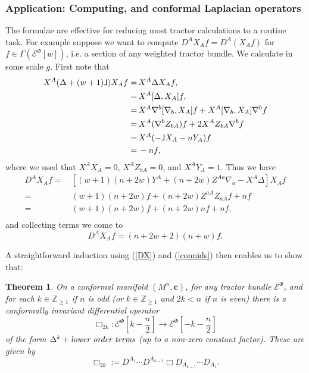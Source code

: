 \documentclass[a4paper,12pt]{amsart}
\def\Cal{\mathcal}
\newcommand{\J}{\mbox{\sf J}}
\newcommand{\cc}{\boldsymbol{c}}
\newcommand{\ce}{{\Cal E}}
\newtheorem{theorem}{Theorem}[section]
\theoremstyle{remark}
\newcommand{\nn}[1]{(\ref{#1})}
\begin{document}
\subsubsection{Application: Computing, and conformal Laplacian operators} \label{laplcn}
The formulae are effective for reducing  most 
tractor calculations to a routine task. For example suppose we want to compute $D^A X_A f = D^A (X_A f)$ for $f\in \Gamma(\ce^\Phi[w])$, i.e. a section of any weighted tractor bundle. We calculate in some scale $g$. First note that 
\begin{equation}\nonumber
\begin{split}
 X^A (\Delta +(w+1)\J)X_ A f=&\, X^A \Delta X_ A f, \\
=&\, X^A [\Delta, X_ A]  f, \\
=&\,X^A \nabla^b[\nabla_b, X_ A]  f+ X^A [\nabla_b, X_ A]\nabla^b f\\
=&\, X^A (\nabla^b Z_{bA}) f + 2 X^A Z_{bA} \nabla^b f\\
= &\, X^A (-\J X_A -n Y_A) f\\
= &\, -n f,
\end{split}
\end{equation}
where we used that $X^AX_A=0$,  $X^A Z_{bA}=0 $, and $X^AY_A=1$. 
Thus we have 
\begin{equation}\nonumber
\begin{split}
 D^A X_ A f=&\, [(w+1)(n+2w)Y^A + (n+2w)Z^{Aa}\nabla_a -X^A \Delta] X_A f\\
=&\,(w+1)(n+2w) f + (n+2w)Z^{aA}Z_{aA} f + n f\\
=&\, (w+1)(n+2w) f + (n+2w)n f + n f,\\
\end{split}
\end{equation}
and collecting terms we come to 
\begin{equation}\label{DX}
D^A X_A f= (n+2w+2)(n+w) f .
\end{equation}

A straightforward induction using \nn{DX} and \nn{connids} then enables us to show that:
\begin{theorem}\label{lapthm}
On a conformal manifold $(M^n,\cc)$,  for any tractor bundle $\ce^\Phi$, and for each $k\in \mathbb{Z}_{\geq 1}$ if $n$ is odd (or $k\in \mathbb{Z}_{\geq 1}$ and $2k<n$ if $n$ is even) there is a conformally invariant differential operator 
$$
\Box_{2k}: \ce^\Phi[k-\frac{n}{2}]\to\ce^\Phi[-k-\frac{n}{2}] 
$$
of the form $\Delta^k+\mbox{\it{lower order terms}}$ (up to a non-zero constant factor). These are given by
$$
\Box_{2k} := D^{A_1}\cdots D^{A_{k-1}}\Box D_{A_{k-1}}\cdots D_{A_1} .
$$
\end{theorem}
\end{document}
